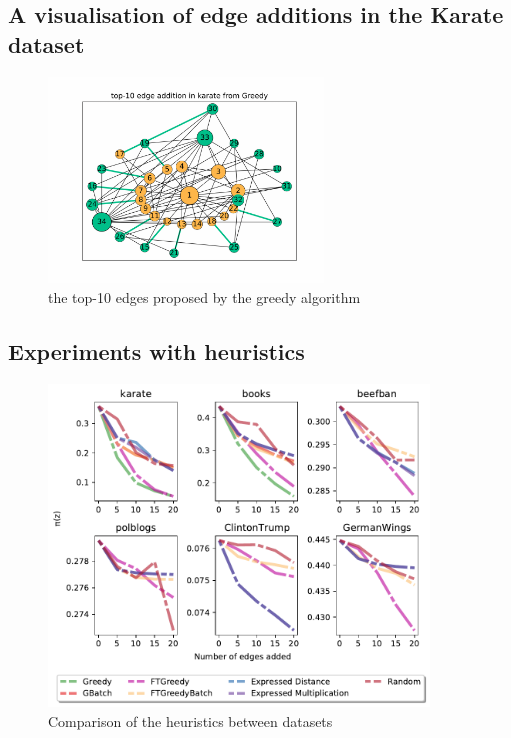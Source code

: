 \vspace{20pt}

\subsection{A visualisation of edge additions in  the Karate dataset}

\vspace{20pt}

\begin{figure}[!htbp]
	\centering
	\captionsetup{justification=centering,margin=2cm}
	\includegraphics[width=0.65\textwidth]{Figures/top-10_karate_greedy}
	\vspace{20pt}
	\caption{the top-10 edges proposed by the greedy algorithm}
	\label{fig:top-10-karate}
\end{figure}

\clearpage


\subsection{Experiments with heuristics}


\begin{figure}[!htbp]
	\centering
	\captionsetup{justification=centering,margin=2cm}
	\includegraphics[width=0.90\textwidth]{Figures/heuristics_small}
	\caption{Comparison of the heuristics between datasets}
	\label{fig:heuristics_small}
\end{figure}

